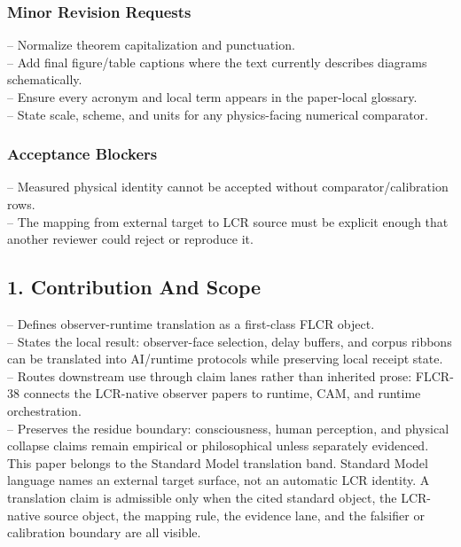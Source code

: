 \documentclass[11pt]{article}
\begin{document}
\subsubsection*{Minor Revision Requests}

\noindent{}-- Normalize theorem capitalization and punctuation.\\
\noindent{}-- Add final figure/table captions where the text currently describes diagrams schematically.\\
\noindent{}-- Ensure every acronym and local term appears in the paper-local glossary.\\
\noindent{}-- State scale, scheme, and units for any physics-facing numerical comparator.\\

\subsubsection*{Acceptance Blockers}

\noindent{}-- Measured physical identity cannot be accepted without comparator/calibration rows.\\
\noindent{}-- The mapping from external target to LCR source must be explicit enough that another reviewer could reject or reproduce it.\\


\subsection*{1. Contribution And Scope}

\noindent{}-- Defines observer-runtime translation as a first-class FLCR object.\\
\noindent{}-- States the local result: observer-face selection, delay buffers, and corpus ribbons can be translated into AI/runtime protocols while preserving local receipt state.\\
\noindent{}-- Routes downstream use through claim lanes rather than inherited prose: FLCR-38 connects the LCR-native observer papers to runtime, CAM, and runtime orchestration.\\
\noindent{}-- Preserves the residue boundary: consciousness, human perception, and physical collapse claims remain empirical or philosophical unless separately evidenced.\\

This paper belongs to the Standard Model translation band. Standard Model language names an external target surface, not an automatic LCR identity. A translation claim is admissible only when the cited standard object, the LCR-native source object, the mapping rule, the evidence lane, and the falsifier or calibration boundary are all visible.
\end{document}
